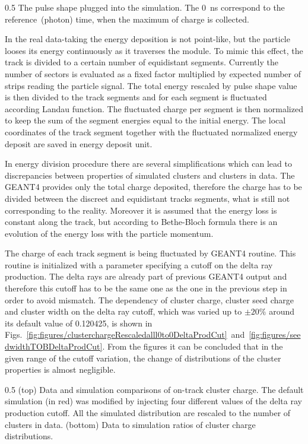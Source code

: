                  {0.5}       %
                 { The pulse shape plugged into the simulation. The 0~ns correspond to the reference~(photon) time, when the maximum of charge is collected.}

In the real data-taking the energy deposition is not point-like, but the particle looses its energy continuously as it traverses the module. To mimic this effect, the track is divided to a certain number of equidistant segments. Currently the number of sectors is evaluated as a fixed factor multiplied by expected number of strips reading the particle signal. The total energy rescaled by pulse shape value is then divided to the track segments and for each segment is fluctuated according Landau function. The fluctuated charge per segment is then normalized to keep the sum of the segment energies equal to the initial energy. The local coordinates of the track segment together with the fluctuated normalized energy deposit are saved in energy deposit unit.

In energy division procedure there are several simplifications which can lead to discrepancies between properties of simulated clusters and clusters in data. The GEANT4 provides only the total charge deposited, therefore the charge has to be divided between the discreet and equidistant tracks segments, what is still not corresponding to the reality. Moreover it is assumed that the energy loss is constant along the track, but according to Bethe-Bloch formula there is an evolution of the energy loss with the particle momentum.

The charge of each track segment is being fluctuated by GEANT4 routine. This routine is initialized with a parameter specifying a cutoff on the delta ray production. The delta rays are already part of previous GEANT4 output and therefore this cutoff has to be the same one as the one in the previous step in order to avoid mismatch. The dependency of cluster charge, cluster seed charge and cluster width on the delta ray cutoff, which was varied up to $\pm 20\%$ around its default value of 0.120425, is shown in Figs.~\ref{fig:figures/clusterchargeRescaledalll0to0DeltaProdCut}~and~\ref{fig:figures/seedwidthTOBDeltaProdCut}. From the figures it can be concluded that in the given range of the cutoff variation, the change of distributions of the cluster properties is almost negligible. 

                 {0.5}       %
                 { (top) Data and simulation comparisons of on-track cluster charge. The default simulation (in red) was modified by injecting four different values of the delta ray production cutoff. All the simulated distribution are rescaled to the number of clusters in data. (bottom) Data to simulation ratios of cluster charge distributions. }

